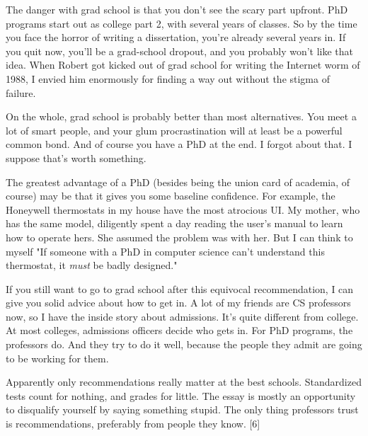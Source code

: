 The
                    danger with grad school is that you don't see the scary part
                    upfront. PhD programs start out as college part 2, with
                    several years of classes. So by the time you face the horror
                    of writing a dissertation, you're already several years in.
                    If you quit now, you'll be a grad-school dropout, and you
                    probably won't like that idea. When Robert got kicked out of
                    grad school for writing the Internet worm of 1988, I envied
                    him enormously for finding a way out without the stigma of
                    failure.
                    

On the whole, grad school is probably
                    better than most alternatives. You meet a lot of smart
                    people, and your glum procrastination will at least be a
                    powerful common bond. And of course you have a PhD at the
                    end. I forgot about that. I suppose that's worth
                    something.

The greatest advantage of a PhD
                    (besides being the union card of academia, of course) may be
                    that it gives you some baseline confidence. For example, the
                    Honeywell thermostats in my house have the most atrocious
                    UI. My mother, who has the same model, diligently spent a
                    day reading the user's manual to learn how to operate hers.
                    She assumed the problem was with her. But I can think to
                    myself "If someone with a PhD in computer science can't
                    understand this thermostat, it \emph{must} be badly
                    designed."

If you still want to go to grad school
                    after this equivocal recommendation, I can give you solid
                    advice about how to get in. A lot of my friends are CS
                    professors now, so I have the inside story about admissions.
                    It's quite different from college. At most colleges,
                    admissions officers decide who gets in. For PhD programs,
                    the professors do. And they try to do it well, because the
                    people they admit are going to be working for them.

Apparently
                    only recommendations really matter at the best schools.
                    Standardized tests count for nothing, and grades for little.
                    The essay is mostly an opportunity to disqualify yourself by
                    saying something stupid. The only thing professors trust is
                    recommendations, preferably from people they know. [6]

